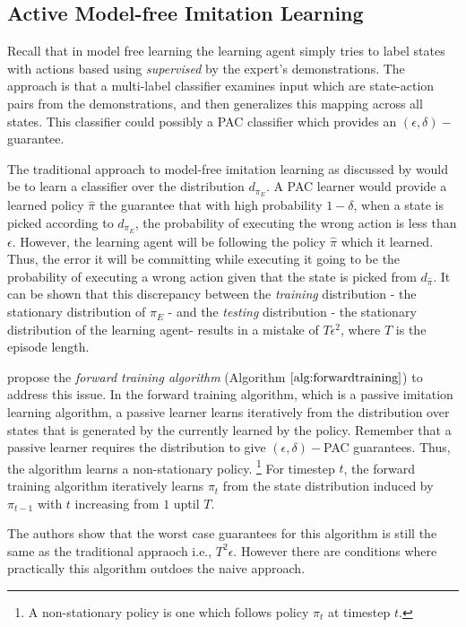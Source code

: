 \subsection{Active Model-free Imitation Learning}
\label{sec:judah_active}
Recall that in model free learning the learning agent simply tries to label states with actions based using \textit{supervised} by the expert's demonstrations. The approach is that a multi-label classifier examines input which are state-action pairs from the demonstrations, and then generalizes this mapping across all states. This classifier could possibly a PAC classifier which provides an $(\epsilon,\delta)-$guarantee. 

The traditional approach to model-free imitation learning as discussed by \citet{DBLP:conf/nips/SyedS10} would be to learn a classifier over the distribution $d_{\pi_E}$. A PAC learner would provide a learned policy $\hat{\pi}$ the guarantee that with high probability $1-\delta$, when a state is picked according to $d_{\pi_E}$, the probability of executing the wrong action is less than $\epsilon$. However, the learning agent will be following the policy $\hat{\pi}$ which it learned. Thus, the error it will be committing while executing it going to be the probability of executing a wrong action given that the state is picked from $d_{\hat{\pi}}$. It can be shown that this discrepancy between the \textit{training} distribution - the stationary distribution of $\pi_E$ - and the \textit{testing} distribution - the stationary distribution of the learning agent- results in a mistake of $T\epsilon^2$, where $T$ is the episode length. 

\citet{DBLP:journals/jmlr/RossB10} propose the \textit{forward training algorithm}  (Algorithm $\ref{alg:forwardtraining}$) to address this issue.  In the forward training algorithm, which is a passive imitation learning algorithm,  a passive learner learns iteratively from the distribution over states that is generated by the currently learned by the policy. Remember that a passive learner requires the distribution to give $(\epsilon,\delta)-$PAC guarantees. Thus, the algorithm learns a non-stationary policy. \footnote{A non-stationary policy is one which follows policy $\pi_t$ at timestep $t$.} For timestep $t$, the forward training algorithm iteratively learns $\pi_t$ from the state distribution induced by $\pi_{t-1}$ with $t$ increasing from $1$ uptil $T$. 

The authors show that the worst case guarantees for this algorithm is still the same as the traditional appraoch i.e., $T^2\epsilon$.  However there are conditions where practically this algorithm outdoes the naive approach. \\

